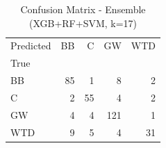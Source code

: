 \begin{table}
\caption{Confusion Matrix - Ensemble (XGB+RF+SVM, k=17)}
\label{tab:ensemble_cm}
\begin{tabular}{lrrrr}
\toprule
Predicted & BB & C & GW & WTD \\
True &  &  &  &  \\
\midrule
BB & 85 & 1 & 8 & 2 \\
C & 2 & 55 & 4 & 2 \\
GW & 4 & 4 & 121 & 1 \\
WTD & 9 & 5 & 4 & 31 \\
\bottomrule
\end{tabular}
\end{table}
